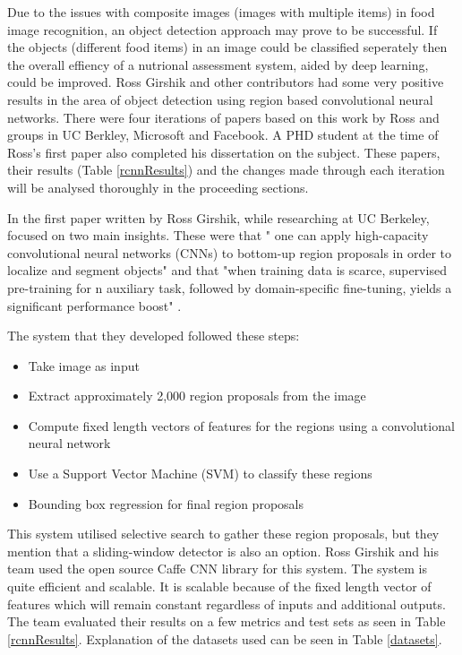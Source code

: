 Due to the issues with composite images (images with multiple items) in food image recognition, an object detection approach may prove to be successful.
If the objects (different food items) in an image could be classified seperately then the overall effiency of a nutrional assessment system, aided by deep learning, could be improved.
Ross Girshik and other contributors had some very positive results in the area
of object detection using region based convolutional neural networks. There were
four iterations of papers based on this work by Ross and groups in UC Berkley,
Microsoft and Facebook. A PHD student at the time of Ross's first paper also
completed his dissertation on the subject. These papers, their
results (Table \ref{rcnnResults}) and the changes made through each iteration will be analysed thoroughly in the proceeding sections.

In the first paper written by Ross Girshik, while researching at UC Berkeley,
focused on two main insights. These were that " one can apply high-capacity convolutional neural networks (CNNs) to bottom-up region proposals in order to localize and segment objects" and that
"when training data is scarce, supervised pre-training for n auxiliary task,
followed by domain-specific fine-tuning, yields a significant performance boost"
\parencite{rcnn}.

The system that they developed followed these steps:
\begin{itemize}
    \item{Take image as input}
    \item{Extract approximately 2,000 region proposals from the image}
    \item{Compute fixed length vectors of features for the regions using a convolutional
        neural network}
    \item{Use a Support Vector Machine (SVM) to classify these regions}
    \item{Bounding box regression for final region proposals}
\end{itemize}

This system utilised selective search to gather these region proposals, but they
mention that a sliding-window detector is also an option. Ross Girshik and his
team used the open source Caffe CNN library for this system. The system is quite
efficient and scalable. It is scalable because of the fixed length vector of
features which will remain constant regardless of inputs and additional outputs.
The team evaluated their results on a few metrics and test sets as seen in Table
\ref{rcnnResults}. Explanation of the datasets used can be seen in Table \ref{datasets}.

